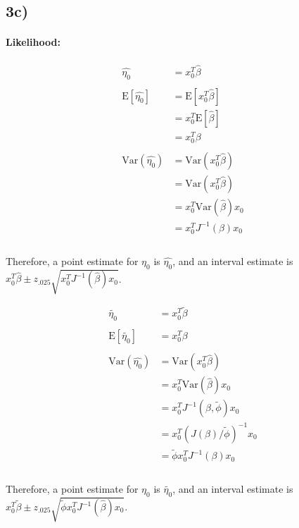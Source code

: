 \documentclass[12pt,]{article}
\let\oldparagraph\paragraph
\renewcommand{\paragraph}[1]{\oldparagraph{#1}\mbox{}}
\newcommand{\p}[1]{\left(#1\right)}
\newcommand{\bk}[1]{\left[#1\right]}
\newcommand{\E}{ \text{E} }
\newcommand{\V}{ \text{Var} }
\begin{document}
\subsection{3c)}\label{c}

\paragraph{Likelihood:}\label{likelihood}

\begin{align*}
\hat{\eta_0} &= x_0^T\hat{\beta} \\
\\
\E\bk{\hat{\eta_0}} &= \E\bk{x_0^T\hat\beta}\\
&= x_0^T\E\bk{\hat\beta}\\
&= x_0^T\beta \\
\\
\V(\hat{\eta_0}) &= \V(x_0^T\hat\beta) \\
&= \V(x_0^T\hat\beta) \\
&= x_0^T\V(\hat\beta)x_0 \\
&= x_0^TJ^{-1}(\beta)x_0 \\
\\
\end{align*}

Therefore, a point estimate for \(\eta_0\) is \(\hat{\eta_0}\), and an
interval estimate is
\(x_0^T\hat\beta \pm z_{.025} \sqrt{x_0^T J^{-1}(\hat\beta)x_0}\).

\begin{align*}
\tilde{\eta_0} &= x_0^T\tilde{\beta} \\
\\
\E\bk{\tilde{\eta_0}} &= x_0^T\beta \\
\\
\V(\hat{\eta_0}) &= \V(x_0^T\hat\beta) \\
&= x_0^T\V(\hat\beta)x_0 \\
&= x_0^TJ^{-1}(\beta,\tilde{\phi})x_0 \\
&= x_0^T\p{J(\beta)/\tilde{\phi}}^{-1}x_0 \\
&= \tilde{\phi}x_0^T J^{-1}(\beta)x_0 \\
\\
\end{align*}

Therefore, a point estimate for \(\eta_0\) is \(\tilde{\eta_0}\), and an
interval estimate is
\(x_0^T\tilde\beta \pm z_{.025} \sqrt{\tilde\phi x_0^T J^{-1}(\hat\beta)x_0}\).
\end{document}
